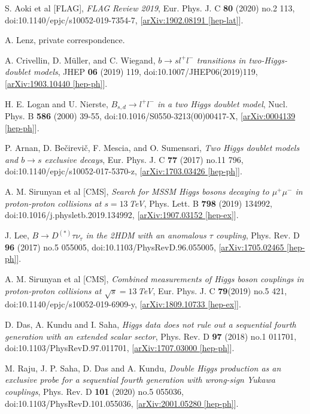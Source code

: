 \documentclass[a4paper,12pt]{article}
\begin{document}
\begin{thebibliography}{99}
S. Aoki et al [FLAG], \emph{FLAG Review 2019}, Eur. Phys. J. C \textbf{80} (2020) no.2 113, doi:10.1140/epjc/s10052-019-7354-7, [\href{https://arxiv.org/abs/1902.08191}{arXiv:1902.08191 [hep-lat]}].

A. Lenz, private correspondence.

A. Crivellin, D. M\"{u}ller, and C. Wiegand, \emph{$b\to sl^+l^-$ transitions in two-Higgs-doublet models}, JHEP \textbf{06} (2019) 119, doi:10.1007/JHEP06(2019)119, [\href{https://arxiv.org/abs/1903.10440}{arXiv:1903.10440 [hep-ph]}].

H. E. Logan and U. Nierste, \emph{$B_{s,d}\to l^+l^-$ in a two Higgs doublet model}, Nucl. Phys. B \textbf{586} (2000) 39-55, doi:10.1016/S0550-3213(00)00417-X, [\href{https://arxiv.org/abs/hep-ph/0004139}{arXiv:0004139 [hep-ph]}].

P. Arnan, D. Be\v{c}irevi\v{c}, F. Mescia, and O. Sumensari, \emph{Two Higgs doublet models and $b\to s$ exclusive decays}, Eur. Phys. J. C \textbf{77} (2017) no.11 796, doi:10.1140/epjc/s10052-017-5370-z, [\href{https://arxiv.org/abs/1703.03426}{arXiv:1703.03426 [hep-ph]}].

A. M. Sirunyan et al [CMS], \emph{Search for MSSM Higgs bosons decaying to $\mu^+\mu^-$ in proton-proton collisions at $s=13\,$TeV}, Phys. Lett. B \textbf{798} (2019) 134992, doi:10.1016/j.physletb.2019.134992, [\href{https://arxiv.org/abs/1907.03152}{arXiv:1907.03152 [hep-ex]}].

J. Lee, \emph{$B\to D^{(*)}\tau\nu_\tau$ in the 2HDM with an anomalous $\tau$ coupling}, Phys. Rev. D \textbf{96} (2017) no.5 055005, doi:10.1103/PhysRevD.96.055005, [\href{https://arxiv.org/abs/1705.02465}{arXiv:1705.02465 [hep-ph]}].

A. M. Sirunyan et al [CMS], \emph{Combined measurements of Higgs boson couplings in proton-proton collisions at $\sqrt{s}=13\,$TeV}, Eur. Phys. J. C \textbf{79}(2019) no.5 421, doi:10.1140/epjc/s10052-019-6909-y, [\href{https://arxiv.org/abs/1809.10733}{arXiv:1809.10733 [hep-ex]}].

D. Das, A. Kundu and I. Saha, \emph{Higgs data does not rule out a sequential fourth generation with an extended scalar sector}, Phys. Rev. D \textbf{97} (2018) no.1 011701, doi:10.1103/PhysRevD.97.011701, [\href{https://arxiv.org/abs/1707.03000}{arXiv:1707.03000 [hep-ph]}].

M. Raju, J. P. Saha, D. Das and A. Kundu, \emph{Double Higgs production as an exclusive probe for a sequential fourth generation with wrong-sign Yukawa couplings}, Phys. Rev. D \textbf{101} (2020) no.5 055036, doi:10.1103/PhysRevD.101.055036, [\href{https://arxiv.org/abs/2001.05280}{arXiv:2001.05280 [hep-ph]}].


\end{thebibliography}
\end{document}
